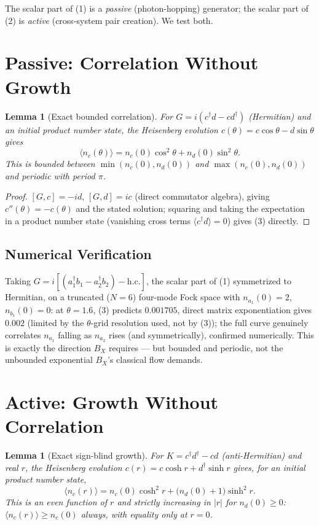 \documentclass[12pt]{amsart}
\theoremstyle{plain}
\newtheorem{lemma}[theorem]{Lemma}
\theoremstyle{remark}
\begin{document}
The scalar part of (1) is a \emph{passive} (photon-hopping) generator; the scalar part of (2) is \emph{active} (cross-system pair creation). We test both.

\section{Passive: Correlation Without Growth}

\begin{lemma}[Exact bounded correlation]\label{lem:passive}
For $G=i(c^\dagger d-cd^\dagger)$ (Hermitian) and an initial product number state, the Heisenberg evolution $c(\theta)=c\cos\theta-d\sin\theta$ gives
\begin{equation}
\langle n_c(\theta)\rangle = n_c(0)\cos^2\theta+n_d(0)\sin^2\theta. \tag{3}
\end{equation}
This is bounded between $\min(n_c(0),n_d(0))$ and $\max(n_c(0),n_d(0))$ and periodic with period $\pi$.
\end{lemma}

\begin{proof}
$[G,c]=-id$, $[G,d]=ic$ (direct commutator algebra), giving $c''(\theta)=-c(\theta)$ and the stated solution; squaring and taking the expectation in a product number state (vanishing cross terms $\langle c^\dagger d\rangle=0$) gives (3) directly.
\end{proof}

\subsection*{Numerical Verification}
Taking $G=i[(a_1^\dagger b_1-a_2^\dagger b_2)-\mathrm{h.c.}]$, the scalar part of (1) symmetrized to Hermitian, on a truncated ($N=6$) four-mode Fock space with $n_{a_1}(0)=2$, $n_{b_1}(0)=0$: at $\theta=1.6$, (3) predicts $0.001705$, direct matrix exponentiation gives $0.002$ (limited by the $\theta$-grid resolution used, not by (3)); the full curve genuinely correlates $n_{a_1}$ falling as $n_{a_2}$ rises (and symmetrically), confirmed numerically. This is exactly the direction $B_X$ requires --- but bounded and periodic, not the unbounded exponential $B_X$'s classical flow demands.

\section{Active: Growth Without Correlation}

\begin{lemma}[Exact sign-blind growth]\label{lem:active}
For $K=c^\dagger d^\dagger-cd$ (anti-Hermitian) and real $r$, the Heisenberg evolution $c(r)=c\cosh r+d^\dagger\sinh r$ gives, for an initial product number state,
\begin{equation}
\langle n_c(r)\rangle = n_c(0)\cosh^2r+\big(n_d(0)+1\big)\sinh^2r. \tag{4}
\end{equation}
This is an even function of $r$ and strictly increasing in $|r|$ for $n_d(0)\ge0$: $\langle n_c(r)\rangle\ge n_c(0)$ always, with equality only at $r=0$.
\end{lemma}
\end{document}
